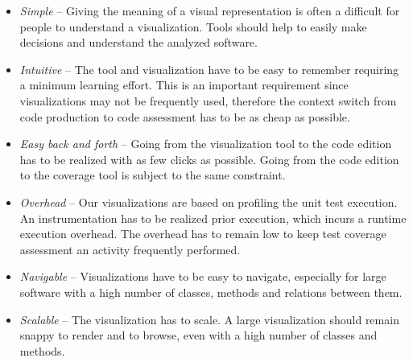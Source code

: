 \documentclass[runningheads]{llncs}
\begin{document}
\begin{itemize}
\item \emph{Simple} -- Giving the meaning of a visual representation is often a difficult for people to understand a visualization. Tools should help to easily make decisions and understand the analyzed software.

\item \emph{Intuitive} -- The tool and visualization have to be easy to remember requiring a minimum learning effort. This is an important requirement since visualizations may not be frequently used, therefore the context switch from code production to code assessment has to be as cheap as possible. 

\item \emph{Easy back and forth} -- Going from the visualization tool to the code edition has to be realized with as few clicks as possible. Going from the code edition to the coverage tool is subject to the same constraint. 

\item \emph{Overhead} -- Our visualizations are based on profiling the unit test execution. An instrumentation has to be realized prior execution, which incurs a runtime execution overhead. The overhead has to remain low to keep test coverage assessment an activity frequently performed. 

\item \emph{Navigable} -- Visualizations have to be easy to navigate, especially for large software with a high number of classes, methods and relations between them.

\item \emph{Scalable} -- The visualization has to scale. A large visualization should remain snappy to render and to browse, even with a high number of classes and methods.
\end{itemize}


%
%
%
\end{document}

